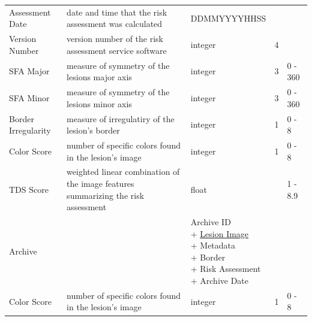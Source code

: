 \begin{longtable}[H]{ | l | p{3.0cm} | p{2.5cm} | p{1.0cm} | p{2.5cm} | }
                    & & \\ \hline

                    Assessment Date & date and time that the risk assessment was calculated &
                    DDMMYYYYHHSS &  &  \\ \hline

                    Version Number & version number of the risk assessment service software &
                    integer & 4 &  \\ \hline

                    SFA Major & measure of symmetry of the lesions major axis &
                    integer & 3 & 0 - 360 \\ \hline

                    SFA Minor & measure of symmetry of the lesions minor axis &
                    integer & 3 & 0 - 360 \\ \hline

                    Border Irregularity & measure of irregulatiry of the lesion's border &
                    integer & 1 & 0 - 8 \\ \hline

                    Color Score & number of specific colors found in the lesion's image &
                    integer & 1 & 0 - 8 \\ \hline

                    \hypertarget{tds_score}{TDS Score} & weighted linear combination of the image features summarizing the risk assessment  &
                    float &  & 1 - 8.9 \\ \hline

                    Archive &  &

                        \specialcell[t]{Archive ID
                            \\ + \hyperlink{lesion_image}{Lesion Image}
                            \\ + Metadata
                            \\ + Border
                            \\ + Risk Assessment
                            \\ + Archive Date
                        }

                     & & \\ \hline


                    Color Score & number of specific colors found in the lesion's image &
                    integer & 1 & 0 - 8 \\ \hline

                \end{longtable}


